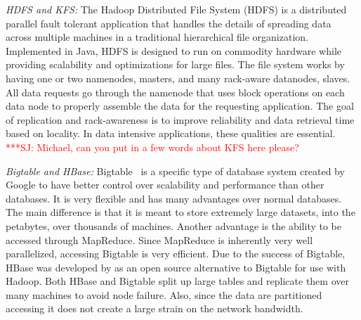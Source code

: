 \documentclass[conference,final]{IEEEtran}
\newcommand{\jhanote}[1]{ {\textcolor{red} { ***SJ: #1 }}}
\newcommand{\jhanote}[1]{}
\begin{document}
{\it HDFS and KFS: }The Hadoop Distributed File System (HDFS) is a
distributed parallel fault tolerant application that handles the
details of spreading data across multiple machines in a traditional
hierarchical file organization.  %
Implemented in Java, HDFS is designed to run on commodity hardware
while providing scalability and optimizations for large files.  The
file system works by having one or two namenodes, masters, and many
rack-aware datanodes, slaves.  All data requests go through the
namenode that uses block operations on each data node to properly
assemble the data for the requesting application.  The goal of
replication and rack-awareness is to improve reliability and data
retrieval time based on locality.  In data intensive applications,
these qualities are essential. \jhanote{Michael, can you put in a few
  words about KFS here please?}

{\it Bigtable and HBase:} Bigtable~\cite{bigtable_small} is a specific
type of database system created by Google to have better control over
scalability and performance than other databases.  It is very flexible
and has many advantages over normal databases.  The main difference is
that it is meant to store extremely large datasets, into the
petabytes, over thousands of machines.  Another advantage is the
ability to be accessed through MapReduce.  Since MapReduce is
inherently very well parallelized, accessing Bigtable is very
efficient.  Due to the success of Bigtable, HBase was developed by as
an open source alternative to Bigtable for use with Hadoop.  Both
HBase and Bigtable split up large tables and replicate them over many
machines to avoid node failure.  Also, since the data are partitioned
accessing it does not create a large strain on the network bandwidth.
\end{document}
